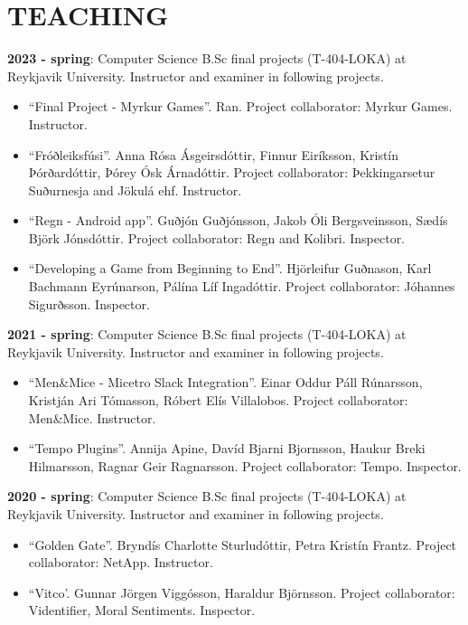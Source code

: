 \section{TEACHING}
\textbf{2023 - spring}:
Computer Science B.Sc final projects (T-404-LOKA) at Reykjavik University.
Instructor and examiner in following projects.

\begin{itemize}
\item ``Final Project - Myrkur Games''. Ran. Project collaborator: Myrkur Games. Instructor.

\item ``Fróðleiksfúsi''. Anna Rósa Ásgeirsdóttir, Finnur Eiríksson, Kristín Þórðardóttir, Þórey Ósk Árnadóttir. Project collaborator: Þekkingarsetur Suðurnesja and Jökulá ehf. Instructor.

\item ``Regn - Android app''. Guðjón Guðjónsson, Jakob Óli Bergsveinsson, Sædís Björk Jónsdóttir. Project collaborator: Regn and Kolibri. Inspector.

\item ``Developing a Game from Beginning to End''. Hjörleifur Guðnason, Karl Bachmann Eyrúnarson, Pálína Líf Ingadóttir. Project collaborator: Jóhannes Sigurðsson. Inspector.
\end{itemize}

\textbf{2021 - spring}:
Computer Science B.Sc final projects (T-404-LOKA) at Reykjavik University.
Instructor and examiner in following projects.

\begin{itemize}
\item ``Men\&Mice - Micetro Slack Integration''. Einar Oddur Páll Rúnarsson, Kristján Ari Tómasson, Róbert Elís Villalobos. Project collaborator: Men\&Mice. Instructor.

\item ``Tempo Plugins''. Annija Apine, Davíd Bjarni Bjornsson, Haukur Breki Hilmarsson, Ragnar Geir Ragnarsson. Project collaborator: Tempo. Inspector.
\end{itemize}

\textbf{2020 - spring}:
Computer Science B.Sc final projects (T-404-LOKA) at Reykjavik University.
Instructor and examiner in following projects.

\begin{itemize}
\item ``Golden Gate''. Bryndís Charlotte Sturludóttir, Petra Kristín Frantz.
    Project collaborator: NetApp. Instructor.

\item ``Vitco'. Gunnar Jörgen Viggósson, Haraldur Björnsson. Project collaborator: Videntifier, Moral Sentiments. Inspector.
\end{itemize}

